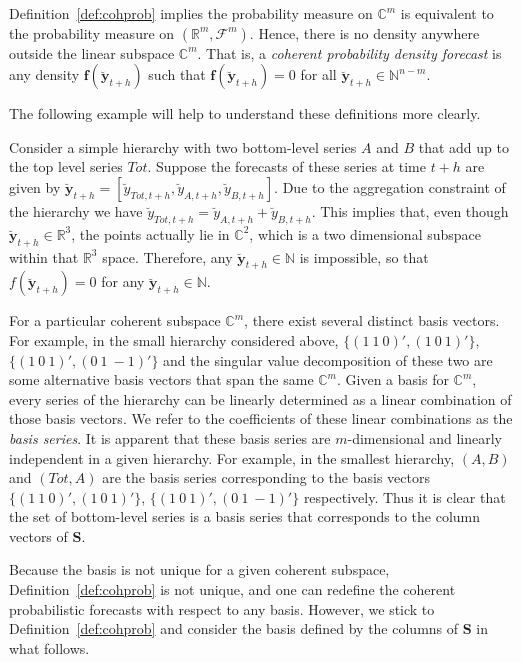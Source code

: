\documentclass[a4paper, 11pt]{article}
\begin{document}
Definition~\ref{def:cohprob} implies the probability measure on $\mathbb{C}^m$ is equivalent to the probability measure on $(\mathbb{R}^m, \bm{\mathscr{F}}^m)$. Hence, there is no density anywhere outside the linear subspace $\mathbb{C}^m$. That is, a \textit{coherent probability density forecast} is any density $\bm{f}(\breve{\bm{y}}_{t+h})$ such that $\bm{f}(\breve{\bm{y}}_{t+h})=0$ for all $\breve{\bm{y}}_{t+h} \in \bm{\mathbb{N}}^{n-m}$. 

The following example will help to understand these definitions more clearly.

Consider a simple hierarchy with two bottom-level series $A$ and $B$ that add up to the top level series $Tot$. Suppose the forecasts of these series at time $t+h$ are given by $\breve{\bm{y}}_{t+h} = [\breve{y}_{Tot,t+h},\breve{y}_{A,t+h}, \breve{y}_{B,t+h}]$. Due to the aggregation constraint of the hierarchy we have $\breve{y}_{Tot,t+h}=\breve{y}_{A,t+h}+\breve{y}_{B,t+h}$. This implies that, even though  $\breve{\bm{y}}_{t+h} \in \mathbb{R}^3$, the points actually lie in $\mathbb{C}^2$, which is a two dimensional subspace within that $\mathbb{R}^3$ space. Therefore, any $\breve{\bm{y}}_{t+h} \in \bm{\mathbb{N}}$ is impossible, so that $f(\breve{\bm{y}}_{t+h})=0$ for any $\breve{\bm{y}}_{t+h} \in \bm{\mathbb{N}}$.

For a particular coherent subspace $\mathbb{C}^m$, there exist several distinct basis vectors. For example, in the small hierarchy considered above, 
 $\{(1 ~1 ~0)', (1 ~0 ~1)'\}$, 
 $\{(1 ~ 0 ~ 1)',(0~1~-\!\!1)'\}$ 
and the singular value decomposition of these two are some alternative basis vectors that span the same $\mathbb{C}^m$. Given a basis for $\mathbb{C}^m$, every series of the hierarchy can be linearly determined as a linear combination of those basis vectors. We refer to the coefficients of these linear combinations as the \textit{basis series}. It is apparent that these basis series are $m$-dimensional and linearly independent in a given hierarchy. For example, in the smallest hierarchy, $(A,B)$ and $(Tot,A)$ are the basis series corresponding to the basis vectors 
 $\{(1 ~1 ~0)', (1 ~0 ~1)'\}$, 
 $\{(1 ~ 0 ~ 1)',(0~1~-\!\!1)'\}$
respectively. Thus it is clear that the set of bottom-level series is a basis series that corresponds to the column vectors of $\bm{S}$. 

Because the basis is not unique for a given coherent subspace, Definition~\ref{def:cohprob} is not unique, and one can redefine the coherent probabilistic forecasts with respect to any basis. However, we stick to Definition~\ref{def:cohprob} and consider the basis defined by the columns of $\bm{S}$ in what follows.
\end{document}
